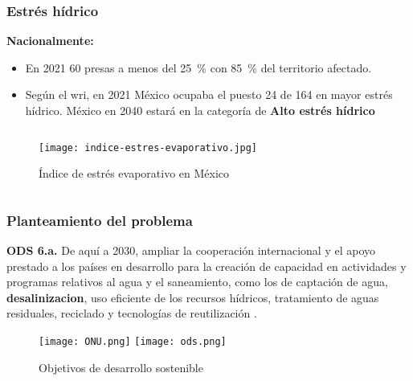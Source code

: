 \begin{frame}
	\frametitle{Estrés hídrico}
	
	\textbf{Nacionalmente:}
			
	\begin{itemize}
		\item En 2021 60 presas a menos del \qty{25}{\percent} con \qty{85}{\percent} del territorio afectado.
		\item Según el \acrshort{wri}, en 2021 México ocupaba el puesto 24 de 164 en mayor estrés hídrico. México en 2040 estará en la categoría de \textbf{Alto estrés hídrico}
	\end{itemize}

	\begin{columns}
		\begin{column}{0.5\textwidth}
			\centering
			\begin{figure}
				\centering
				\texttt{[image: indice-estres-evaporativo.jpg]}
				\caption{Índice de estrés evaporativo en México}
			\end{figure}
		\end{column}
		\begin{column}{0.5\textwidth}
			{\scriptsize
			}
			\vspace*{10mm}
			{\scriptsize
			}
		\end{column}
	\end{columns}
\end{frame}

\begin{frame}
    \frametitle{Planteamiento del problema}
    \begin{displayquote}
        \justifying
        \textbf{ODS 6.a.} De aquí a 2030, ampliar la cooperación internacional y el apoyo prestado a los países en desarrollo para la creación de capacidad en actividades y programas relativos al agua y el saneamiento, como los de captación de agua, \textbf{\gls{desalinizacion}}, uso eficiente de los recursos hídricos, tratamiento de aguas residuales, reciclado y tecnologías de reutilización \cite{naciones_unidas_sustainable_nodate}.
    \end{displayquote}\vspace*{6mm}
    \centering
    \begin{figure}
        \centering
        \texttt{[image: ONU.png]}
        \texttt{[image: ods.png]}
        \caption{Objetivos de desarrollo sostenible}
    \end{figure}
    
\end{frame}